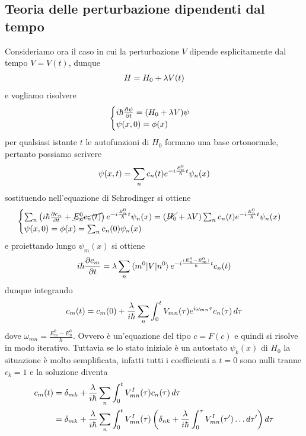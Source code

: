 \documentclass{article}
\begin{document}
\subsection{Teoria delle perturbazione dipendenti dal tempo}
Consideriamo ora il caso in cui la perturbazione $V$ dipende esplicitamente dal tempo $V = V(t)$, dunque
\begin{gather}
    H = H_0 + \lambda V(t) \notag
\end{gather}
e vogliamo risolvere
\begin{gather}
    \begin{cases}
        i\hbar\frac{\partial \psi}{\partial t} = (H_0 + \lambda V)\psi \\
        \psi(x, 0) = \phi(x) 
    \end{cases} \notag
\end{gather}
per qualsiasi istante $t$ le autofunzioni di $H_0$ formano una base ortonormale, pertanto possiamo scrivere
\begin{gather}
    \psi(x, t) = \sum_{n} c_n(t)e^{-i\frac{E^0_n}{\hbar}t}\psi_n(x) \notag
\end{gather}
sostituendo nell'equazione di Schrodinger si ottiene
\begin{gather}
    \begin{cases}
        \sum_n\left( i\hbar\frac{\partial c_n}{\partial t} + \cancel{E^0_nc_n(t)}\right)e^{-i\frac{E^0_n}{\hbar}t}\psi_n(x) = (\cancel{H_0} + \lambda V)\sum_n c_n(t)e^{-i\frac{E^0_n}{\hbar}t}\psi_n(x) \\
        \psi(x, 0) = \phi(x) = \sum_n c_n(0)\psi_n(x) 
    \end{cases}\notag
\end{gather}
e proiettando lungo $\psi_m(x)$ si ottiene
\begin{gather}
    i\hbar\frac{\partial c_m}{\partial t} = \lambda\sum_n \braket{m^0|V|n^0}e^{-i\frac{(E^0_n - E^0_m)}{\hbar}t}c_n(t) \notag
\end{gather}
dunque integrando
\begin{gather}
    c_m(t) = c_m(0) + \frac{\lambda}{i\hbar}\sum_n\int_0^t V_{mn}(\tau)e^{i\omega_{mn}\tau}c_n(\tau) \, d\tau \notag
\end{gather}
dove $\omega_{mn} = \frac{E_m^0 - E_n^0}{\hbar}$. Ovvero è un'equazione del tipo $c = F(c)$ e quindi si risolve in modo iterativo. Tuttavia se lo stato iniziale è un autostato $\psi_k(x)$ di $H_0$ la situazione è molto semplificata, infatti tutti i coefficienti a $t = 0$ sono nulli tranne $c_k = 1$ e la soluzione diventa
\begin{align}
    c_m(t) &= \delta_{mk} + \frac{\lambda}{i\hbar}\sum_n\int_0^t V_{mn}^I(\tau)c_n(\tau) \, d\tau \notag \\
    &= \delta_{mk} + \frac{\lambda}{i\hbar}\sum_n\int_0^t V_{mn}^I(\tau)\left( \delta_{nk} + \frac{\lambda}{i\hbar}\int_0^\tau V_{mn}^I(\tau') \dots d\tau'\right)d\tau \notag
\end{align}
\end{document}
